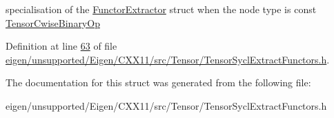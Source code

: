 specialisation of the \hyperlink{struct_eigen_1_1_tensor_sycl_1_1internal_1_1_functor_extractor}{Functor\+Extractor} struct when the node type is const \hyperlink{class_eigen_1_1_tensor_cwise_binary_op}{Tensor\+Cwise\+Binary\+Op} 

Definition at line \hyperlink{eigen_2unsupported_2_eigen_2_c_x_x11_2src_2_tensor_2_tensor_sycl_extract_functors_8h_source_l00063}{63} of file \hyperlink{eigen_2unsupported_2_eigen_2_c_x_x11_2src_2_tensor_2_tensor_sycl_extract_functors_8h_source}{eigen/unsupported/\+Eigen/\+C\+X\+X11/src/\+Tensor/\+Tensor\+Sycl\+Extract\+Functors.\+h}.



The documentation for this struct was generated from the following file\+:\begin{DoxyCompactItemize}
\item 
eigen/unsupported/\+Eigen/\+C\+X\+X11/src/\+Tensor/\+Tensor\+Sycl\+Extract\+Functors.\+h\end{DoxyCompactItemize}
